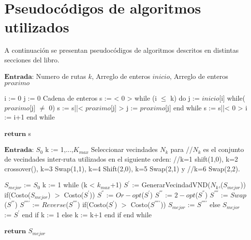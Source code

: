 \chapter{Pseudocódigos de algoritmos utilizados}\label{chap:apendiceA}

A continuación se presentan pseudocódigos de algoritmos descritos en distintas secciones del libro.

\begin{code}[includerangemarker=false,frame=single,label=alg:ConstRutas,caption=Pseudocódigo de construcción de las rutas de los vehículos a partir de la estructura de datos de representación de la solución,firstnumber=100, mathescape]
$\textbf{Entrada:}$ Numero de rutas $k$, Arreglo de enteros $inicio$, Arreglo de enteros $proximo$
 
i := 0
j := 0
Cadena de enteros s := < 0 >
while (i $\leqslant$ k) do
	j := $inicio$[i]
	while($proximo$[j] $\neq$ 0)			
		s := s||< $proximo$[j] >
		j := $proximo$[j]
	end while
	s :=  s||< 0 >
	i := i+1
end while 

$\textbf{return}$ s 
\end{code}

%    
%
%

\begin{code}[includerangemarker=false,frame=single,label=alg:VND,caption=Pseudocódigo de VND,firstnumber=100, mathescape]
$\textbf{Entrada}$: $S_0$
k := 1,...,$K_{max}$ 
Seleccionar vecindades $N_{k}$ para 
//$N_{k}$ es el conjunto de vecindades inter-ruta utilizados en el siguiente orden:
//k=1 shift(1,0), k=2 crossover(), k=3 Swap(1,1), k=4 Shift(2,0), k=5 Swap(2,1) y 
//k=6 Swap(2,2).

$S_{mejor}$ := $S_0$
k := 1
while (k < $k_{max}$+1)
    $S^{'}$ := GenerarVecindadVND($N_{k}$,($S_{mejor}$))
	if(Costo($S_{mejor}$) $>$ Costo($S^{'}$))		
		$S^{''}$ := $Or-opt$($S^{'}$)
		$S^{'''}$ := $2-opt$($S^{''}$)
		$S^{''''}$ := $Swap$($S^{'''}$)		
		$S^{'''''}$ := $Reverse$($S^{''''}$)
		if(Costo($S^{'}$) $>$ Costo($S^{'''''}$))
			$S_{mejor}$ := $S^{'''''}$
		else
			$S_{mejor}$ := $S^{'}$
		end if	
		k := 1
	else
	 k := k+1
	end if 			
end while

$\textbf{return}$ $S_{mejor}$
\end{code}

